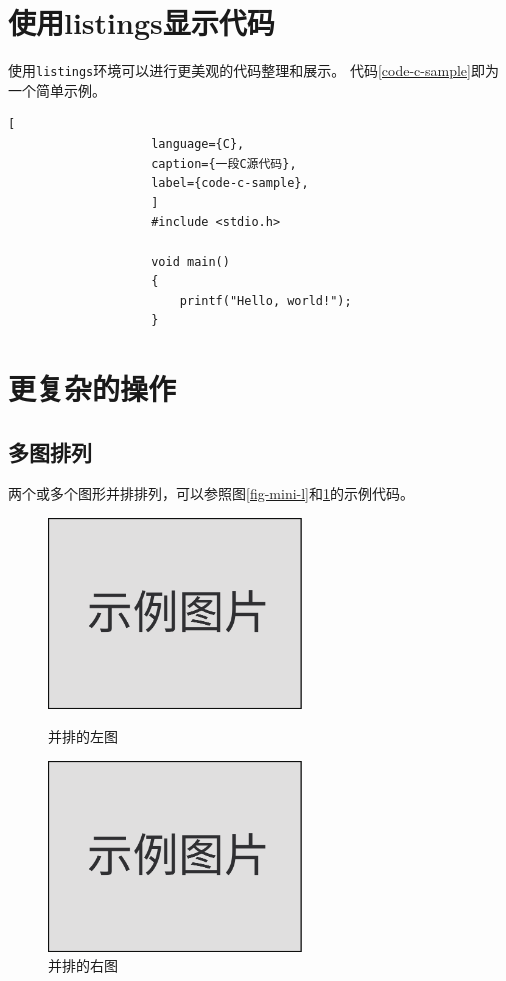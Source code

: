 				\section{使用listings显示代码}
				\label{sec-listings}
				使用\texttt{listings}环境可以进行更美观的代码整理和展示。
				代码\ref{code-c-sample}即为一个简单示例。
				\begin{lstlisting}[
					language={C},
					caption={一段C源代码},
					label={code-c-sample},
					]
					#include <stdio.h>
					
					void main()
					{
						printf("Hello, world!");
					}
				\end{lstlisting}
				
				\section{更复杂的操作}
				\label{sec-more}
				
				\subsection{多图排列}
				\label{subsec-multi-fig}
				两个或多个图形并排排列，可以参照图\ref{fig-mini-l}和\ref{fig-mini-r}的示例代码。
				\begin{figure}[h!] %
					\begin{minipage}{.5\textwidth} %
						\centering
						\includegraphics[width=0.6\textwidth]{figure/image.pdf}
						\caption{并排的左图}
						\label{fig-mini-l}
					\end{minipage}
					\begin{minipage}{.5\textwidth}
						\centering
						\includegraphics[width=0.6\textwidth]{figure/image.pdf}
						\caption{并排的右图}
						\label{fig-mini-r}
					\end{minipage}
				\end{figure}
				
